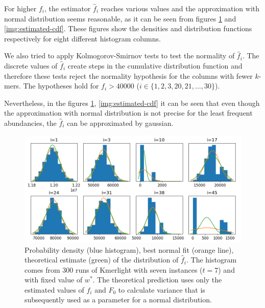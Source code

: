 For higher $f_i$, the estimator $\hat f_i$ reaches various values and the approximation with normal distribution
seems reasonable, as it can be seen from figures \ref{img:estimated-pdf} and \ref{img:estimated-cdf}.
These figures show the densities and distribution functions respectively for eight different histogram columns.

We also tried to apply Kolmogorov-Smirnov tests to test the normality of $\hat f_i$. The discrete values of $\hat f_i$
create steps in the cumulative distribution function and therefore these tests reject the normality hypothesis
for the columns with fewer $k$-mers. The hypotheses hold for $f_i > 40000$ ($i \in \{1,2,3,20,21, \dots, 30\}$). 

Nevertheless, in the figures \ref{img:estimated-pdf}, \ref{img:estimated-cdf} it can be
seen that even though the approximation with normal distribution is not precise for the
least frequent abundancies, the $\hat f_i$ can be approximated by gaussian.

\begin{figure}[h]
\centerline{\includegraphics[width=1\textwidth, trim={0cm, 0cm, 0cm, 0cm}, clip]{images/estimated-pdf.png}}
\caption[Density functions of $\hat f_i$]{Probability density (blue histogram), best normal fit (orange line),
theoretical estimate (green) of the distribution of $\hat f_i$. The histogram comes from 300 runs of Kmerlight
with seven instances ($t=7$) and with fixed value of $w^*$. The theoretical prediction uses only the estimated values of 
$f_i$ and $F_0$ to calculate variance that is subsequently used as a parameter for a normal distribution.}
\label{img:estimated-pdf}
\end{figure}

